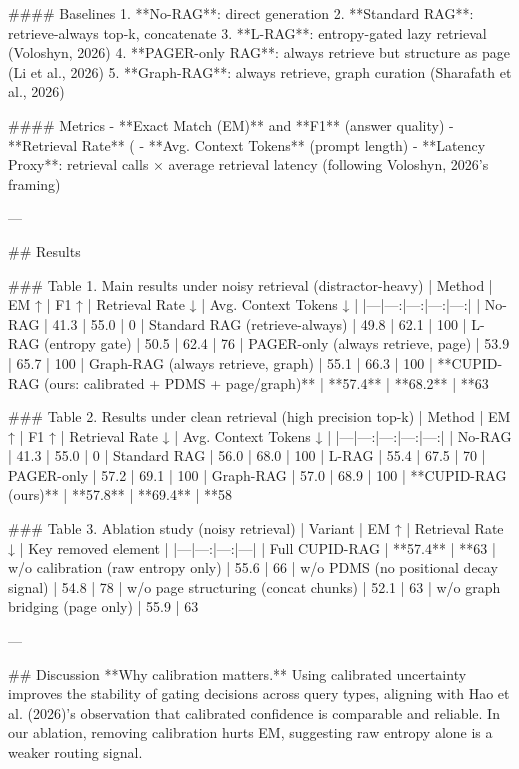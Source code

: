 #### Baselines  
1. **No-RAG**: direct generation  
2. **Standard RAG**: retrieve-always top-k, concatenate  
3. **L-RAG**: entropy-gated lazy retrieval (Voloshyn, 2026)  
4. **PAGER-only RAG**: always retrieve but structure as page (Li et al., 2026)  
5. **Graph-RAG**: always retrieve, graph curation (Sharafath et al., 2026)  

#### Metrics  
- **Exact Match (EM)** and **F1** (answer quality)  
- **Retrieval Rate** (%
- **Avg. Context Tokens** (prompt length)  
- **Latency Proxy**: retrieval calls × average retrieval latency (following Voloshyn, 2026’s framing)

---

## Results  

### Table 1. Main results under noisy retrieval (distractor-heavy)  
| Method | EM ↑ | F1 ↑ | Retrieval Rate ↓ | Avg. Context Tokens ↓ |
|---|---:|---:|---:|---:|
| No-RAG | 41.3 | 55.0 | 0%
| Standard RAG (retrieve-always) | 49.8 | 62.1 | 100%
| L-RAG (entropy gate) | 50.5 | 62.4 | 76%
| PAGER-only (always retrieve, page) | 53.9 | 65.7 | 100%
| Graph-RAG (always retrieve, graph) | 55.1 | 66.3 | 100%
| **CUPID-RAG (ours: calibrated + PDMS + page/graph)** | **57.4** | **68.2** | **63%

### Table 2. Results under clean retrieval (high precision top-k)  
| Method | EM ↑ | F1 ↑ | Retrieval Rate ↓ | Avg. Context Tokens ↓ |
|---|---:|---:|---:|---:|
| No-RAG | 41.3 | 55.0 | 0%
| Standard RAG | 56.0 | 68.0 | 100%
| L-RAG | 55.4 | 67.5 | 70%
| PAGER-only | 57.2 | 69.1 | 100%
| Graph-RAG | 57.0 | 68.9 | 100%
| **CUPID-RAG (ours)** | **57.8** | **69.4** | **58%

### Table 3. Ablation study (noisy retrieval)  
| Variant | EM ↑ | Retrieval Rate ↓ | Key removed element |
|---|---:|---:|---|
| Full CUPID-RAG | **57.4** | **63%
| w/o calibration (raw entropy only) | 55.6 | 66%
| w/o PDMS (no positional decay signal) | 54.8 | 78%
| w/o page structuring (concat chunks) | 52.1 | 63%
| w/o graph bridging (page only) | 55.9 | 63%

---

## Discussion  
**Why calibration matters.** Using calibrated uncertainty improves the stability of gating decisions across query types, aligning with Hao et al. (2026)’s observation that calibrated confidence is comparable and reliable. In our ablation, removing calibration hurts EM, suggesting raw entropy alone is a weaker routing signal.

